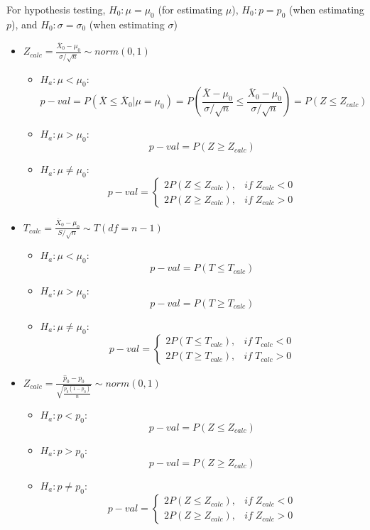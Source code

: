 \documentclass[12pt, a4paper, twoside, openright, titlepage]{book}
\begin{document}
\begin{rmk}{}{}
    For hypothesis testing, $H_0:\mu = \mu_0$ (for estimating $\mu$), $H_0:p = p_0$ (when estimating $p$), and $H_0:\sigma = \sigma_0$ (when estimating $\sigma$)
\end{rmk}


\begin{rmk}{}{}
    \leavevmode
    \begin{itemize}
        \item $Z_{calc} = \frac{\overline{X}_0 - \mu_0}{\sigma/\sqrt{n}}\sim norm(0,1)$ \begin{itemize}
                \item $H_a: \mu < \mu_0$: $$p-val = P(\overline{X} \leq \overline{X}_0\vert\mu=\mu_0) = P\left(\frac{\overline{X}-\mu_0}{\sigma/\sqrt{n}} \leq \frac{\overline{X}_0-\mu_0}{\sigma/\sqrt{n}}\right) = P(Z\leq Z_{calc})$$
                \item $H_a:\mu > \mu_0$: $$p-val = P(Z\geq Z_{calc})$$
                \item $H_a:\mu \neq \mu_0$: $$p-val = \left\{\begin{array}{lc} 2P(Z\leq Z_{calc}), & if\;Z_{calc} < 0 \\ 2P(Z \geq Z_{calc}), & if\;Z_{calc} > 0 \end{array}\right.$$
        \end{itemize}
        \item $T_{calc} = \frac{\overline{X}_0 - \mu_0}{S/\sqrt{n}}\sim T(df = n-1)$ \begin{itemize}
                \item $H_a: \mu < \mu_0$: $$p-val = P(T\leq T_{calc})$$
                \item $H_a:\mu > \mu_0$: $$p-val = P(T\geq T_{calc})$$
                \item $H_a:\mu \neq \mu_0$: $$p-val = \left\{\begin{array}{lc} 2P(T\leq T_{calc}), & if\;T_{calc} < 0 \\ 2P(T \geq T_{calc}), & if\;T_{calc} > 0 \end{array}\right.$$
        \end{itemize}
        \item $Z_{calc} = \frac{\hat{p}_0 - p_0}{\sqrt{\frac{p_0(1-p_0)}{n}}}\sim norm(0,1)$ \begin{itemize}
                \item $H_a: p < p_0$: $$p-val = P(Z\leq Z_{calc})$$
                \item $H_a: p > p_0$: $$p-val = P(Z\geq Z_{calc})$$
                \item $H_a:p \neq p_0$: $$p-val = \left\{\begin{array}{lc} 2P(Z\leq Z_{calc}), & if\;Z_{calc} < 0 \\ 2P(Z \geq Z_{calc}), & if\;Z_{calc} > 0 \end{array}\right.$$
        \end{itemize}
    \end{itemize}
\end{rmk}
\end{document}

